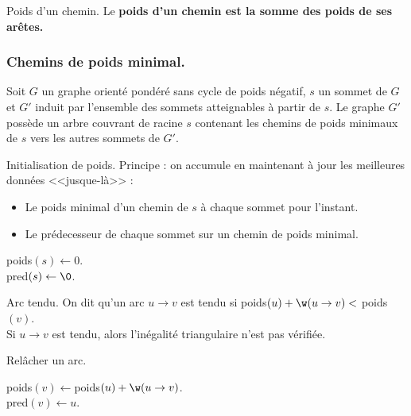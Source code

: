 \documentclass[french, 11pt]{article}
\begin{document}
\begin{defi}{Poids d'un chemin.}{}
    Le \bf{poids} d'un chemin est la somme des poids de ses arêtes.
\end{defi}

\subsubsection{Chemins de poids minimal.}

\begin{prop}{}{}
    Soit $G$ un graphe orienté pondéré sans cycle de poids négatif, $s$ un sommet de $G$ et $G'$ induit par l'ensemble des sommets atteignables à partir de $s$. Le graphe $G'$ possède un arbre couvrant de racine $s$ contenant les chemins de poids minimaux de $s$ vers les autres sommets de $G'$.
\end{prop}

\begin{defi}{Initialisation de poids.}{}
    Principe : on accumule en maintenant à jour les meilleures données <<jusque-là>> :
    \begin{itemize}[topsep=0pt,itemsep=-0.9 ex]
        \item Le poids minimal d'un chemin de $s$ à chaque sommet pour l'instant.
        \item Le prédecesseur de chaque sommet sur un chemin de poids minimal.
    \end{itemize}
    \begin{algorithm}[H]
        \LinesNumbered
        \caption{Initialisation de poids.}
        poids$(s)\gets0$.\\
        pred$(s)\gets\0$.\\
    \end{algorithm}
\end{defi}

\begin{defi}{Arc tendu.}{}
    On dit qu'un arc $u\to v$ est tendu si poids$(u)+\w(u\to v)<$ poids$(v)$.\\
    Si $u\to v$ est tendu, alors l'inégalité triangulaire n'est pas vérifiée.
\end{defi}

\begin{defi}{Relâcher un arc.}{}
    \begin{algorithm}[H]
        \LinesNumbered
        \caption{Relâcher un arc.}
        poids$(v)\gets$poids$(u)+\w(u\to v)$.\\
        pred$(v)\gets u$.
    \end{algorithm}
\end{defi}
\end{document}
